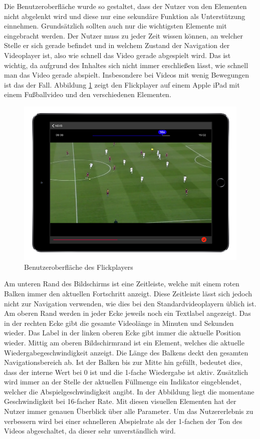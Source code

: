 \documentclass[11pt,a4paper]{report}
\begin{document}
Die Benutzeroberfläche wurde so gestaltet, dass der Nutzer von den Elementen nicht abgelenkt wird und diese nur eine sekundäre Funktion als Unterstützung einnehmen. Grundsätzlich sollten auch nur die wichtigsten Elemente mit eingebracht werden. Der Nutzer muss zu jeder Zeit wissen können, an welcher Stelle er sich gerade befindet und in welchem Zustand der Navigation der Videoplayer ist, also wie schnell das Video gerade abgespielt wird. Das ist wichtig, da aufgrund des Inhaltes sich nicht immer erschließen lässt, wie schnell man das Video gerade abspielt. Insbesondere bei Videos mit wenig Bewegungen ist das der Fall. Abbildung \ref{flickplayer_gui} zeigt den Flickplayer auf einem Apple iPad mit einem Fußballvideo und den verschiedenen Elementen.
\begin{figure}[h]
\begin{center}
\includegraphics[scale=1.1]{./images/18.png}
\caption{Benutzeroberfläche des Flickplayers}
\label{flickplayer_gui}
\end{center}
\end{figure}
Am unteren Rand des Bildschirms ist eine Zeitleiste, welche mit einem roten Balken immer den aktuellen Fortschritt anzeigt. Diese Zeitleiste lässt sich jedoch nicht zur Navigation verwenden, wie dies bei den Standardvideoplayern üblich ist. Am oberen Rand werden in jeder Ecke jeweils noch ein Textlabel angezeigt. Das in der rechten Ecke gibt die gesamte Videolänge in Minuten und Sekunden wieder. Das Label in der linken oberen Ecke gibt immer die aktuelle Position wieder. Mittig am oberen Bildschirmrand ist ein Element, welches die aktuelle Wiedergabegeschwindigkeit anzeigt. Die Länge des Balkens deckt den gesamten Navigationsbereich ab. Ist der Balken bis zur Mitte hin gefüllt, bedeutet dies, dass der interne Wert bei 0 ist und die 1-fache Wiedergabe ist aktiv. Zusätzlich wird immer an der Stelle der aktuellen Füllmenge ein Indikator eingeblendet, welcher die Abspielgeschwindigkeit angibt. In der Abbildung liegt die momentane Geschwindigkeit bei 16-facher Rate. Mit diesen visuellen Elementen hat der Nutzer immer genauen Überblick über alle Parameter. Um das Nutzererlebnis zu verbessern wird bei einer schnelleren Abspielrate als der 1-fachen der Ton des Videos abgeschaltet, da dieser sehr unverständlich wird.
\end{document}
